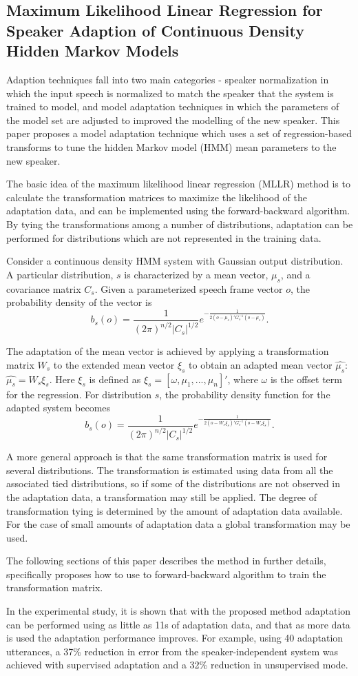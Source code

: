 \subsection{Maximum Likelihood Linear Regression for Speaker Adaption of Continuous Density Hidden Markov Models \cite{Leggetter1995}}

Adaption techniques fall into two main categories - speaker normalization in which the input speech is normalized to match the speaker that the system is trained to model, and model adaptation techniques in which the parameters of the model set are adjusted to improved the modelling of the new speaker. This paper proposes a model adaptation technique which uses a set of regression-based transforms to tune the hidden Markov model (HMM) mean parameters to the new speaker.

The basic idea of the maximum likelihood linear regression (MLLR) method is to calculate the transformation matrices to maximize the likelihood of the adaptation data, and can be implemented using the forward-backward algorithm. By tying the transformations among a number of distributions, adaptation can be performed for distributions which are not represented in the training data.

Consider a continuous density HMM system with Gaussian output distribution. A particular distribution, $s$ is characterized by a mean vector, $\mu_s$, and a covariance matrix $C_s$. Given a parameterized speech frame vector $o$, the probability density of the vector is
$$b_s(o) = \frac{1}{(2\pi)^{n/2} |C_s|^{1/2}} e^{-\frac{1}{2(o - \mu_s)'G_s^{-1}(o-\mu_s)}}.$$

The adaptation of the mean vector is achieved by applying a transformation matrix $W_s$ to the extended mean vector $\xi_s$ to obtain an adapted mean vector $\hat{\mu_s}$: $\hat{\mu_s} = W_s \xi_s$. Here $\xi_s$ is defined as $\xi_s = [\omega, \mu_1, ..., \mu_n]'$, where $\omega$ is the offset term for the regression. For distribution $s$, the probability density function for the adapted system becomes
$$b_s(o) = \frac{1}{(2\pi)^{n/2} |C_s|^{1/2}} e^{-\frac{1}{2(o - W_s \xi_s)'G_s^{-1}(o-W_s \xi_s)}}.$$

A more general approach is that the same transformation matrix is used for several distributions. The transformation is estimated using data from all the associated tied distributions, so if some of the distributions are not observed in the adaptation data, a transformation may still be applied. The degree of transformation tying is determined by the amount of adaptation data available. For the case of small amounts of adaptation data a global transformation may be used.

The following sections of this paper describes the method in further details, specifically proposes how to use to forward-backward algorithm to train the transformation matrix.

In the experimental study, it is shown that with the proposed method adaptation can be performed using as little as 11s of adaptation data, and that as more data is used the adaptation performance improves. For example, using 40 adaptation utterances, a 37\% reduction in error from the speaker-independent system was achieved with supervised adaptation and a 32\% reduction in unsupervised mode. 